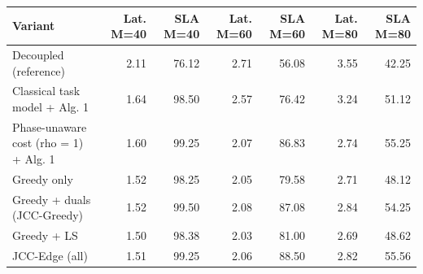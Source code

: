 \begin{tabular}{lrrrrrr}
\toprule
Variant & Lat. M=40 & SLA M=40 & Lat. M=60 & SLA M=60 & Lat. M=80 & SLA M=80 \\
\midrule
Decoupled (reference) & 2.11 & 76.12 & 2.71 & 56.08 & 3.55 & 42.25 \\
Classical task model + Alg. 1 & 1.64 & 98.50 & 2.57 & 76.42 & 3.24 & 51.12 \\
Phase-unaware cost (rho = 1) + Alg. 1 & 1.60 & 99.25 & 2.07 & 86.83 & 2.74 & 55.25 \\
Greedy only & 1.52 & 98.25 & 2.05 & 79.58 & 2.71 & 48.12 \\
Greedy + duals (JCC-Greedy) & 1.52 & 99.50 & 2.08 & 87.08 & 2.84 & 54.25 \\
Greedy + LS & 1.50 & 98.38 & 2.03 & 81.00 & 2.69 & 48.62 \\
JCC-Edge (all) & 1.51 & 99.25 & 2.06 & 88.50 & 2.82 & 55.56 \\
\bottomrule
\end{tabular}
